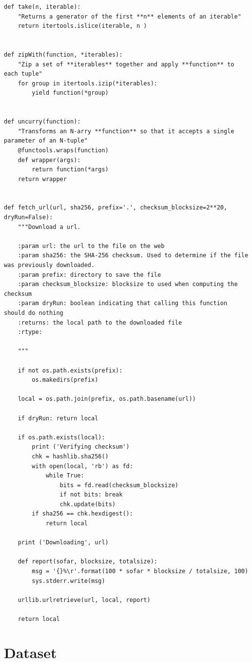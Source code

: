 \begin{lstlisting}
def take(n, iterable):
    "Returns a generator of the first **n** elements of an iterable"
    return itertools.islice(iterable, n )


def zipWith(function, *iterables):
    "Zip a set of **iterables** together and apply **function** to each tuple"
    for group in itertools.izip(*iterables):
        yield function(*group)


def uncurry(function):
    "Transforms an N-arry **function** so that it accepts a single parameter of an N-tuple"
    @functools.wraps(function)
    def wrapper(args):
        return function(*args)
    return wrapper


def fetch_url(url, sha256, prefix='.', checksum_blocksize=2**20, dryRun=False):
    """Download a url.

    :param url: the url to the file on the web
    :param sha256: the SHA-256 checksum. Used to determine if the file was previously downloaded.
    :param prefix: directory to save the file
    :param checksum_blocksize: blocksize to used when computing the checksum
    :param dryRun: boolean indicating that calling this function should do nothing
    :returns: the local path to the downloaded file
    :rtype:

    """

    if not os.path.exists(prefix):
        os.makedirs(prefix)

    local = os.path.join(prefix, os.path.basename(url))

    if dryRun: return local

    if os.path.exists(local):
        print ('Verifying checksum')
        chk = hashlib.sha256()
        with open(local, 'rb') as fd:
            while True:
                bits = fd.read(checksum_blocksize)
                if not bits: break
                chk.update(bits)
        if sha256 == chk.hexdigest():
            return local

    print ('Downloading', url)

    def report(sofar, blocksize, totalsize):
        msg = '{}%\r'.format(100 * sofar * blocksize / totalsize, 100)
        sys.stderr.write(msg)

    urllib.urlretrieve(url, local, report)

    return local
\end{lstlisting}

\section{Dataset}\label{dataset}

